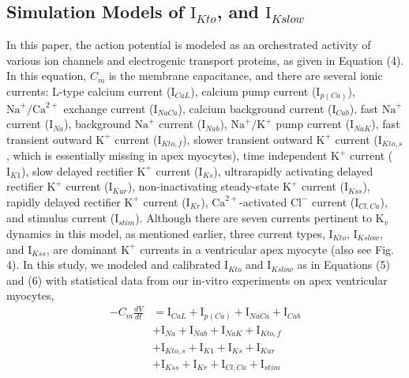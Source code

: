 \documentclass[journal]{IEEEtran}
\begin{document}
\subsection{Simulation Models of $\text{I}_{Kto}$, and $\text{I}_{Kslow}$}
In this paper, the action potential is modeled as an orchestrated activity of various ion channels and electrogenic transport proteins, as given in Equation (4). In this equation, $C_m$ is the membrane capacitance, and there are several ionic currents: L-type calcium current ($\text{I}_{CaL}$), calcium pump current ($\text{I}_{p(Ca)}$), $\text{Na}^{+}/\text{Ca}^{2+}$ exchange current ($\text{I}_{NaCa}$), calcium background current ($\text{I}_{Cab}$), fast $\text{Na}^{+}$ current ($\text{I}_{Na}$), background $\text{Na}^{+}$ current ($\text{I}_{Nab}$), $\text{Na}^{+}/\text{K}^{+}$ pump current ($\text{I}_{NaK}$), fast transient outward $\text{K}^{+}$ current ($\text{I}_{Kto,f}$), slower transient outward $\text{K}^{+}$ current ($\text{I}_{Kto,s}$, which is essentially missing in apex myocytes), time independent $\text{K}^{+}$ current ($\text{I}_{K1}$), slow delayed rectifier $\text{K}^{+}$ current ($\text{I}_{Ks}$), ultrarapidly activating delayed rectifier $\text{K}^{+}$ current ($\text{I}_{Kur}$), non-inactivating steady-state $\text{K}^{+}$ current ($\text{I}_{Kss}$), rapidly delayed rectifier $\text{K}^{+}$ current ($\text{I}_{Kr}$), $\text{Ca}^{2+}$-activated $\text{Cl}^{-}$ current ($\text{I}_{Cl,Ca}$), and stimulus current ($\text{I}_{stim}$). Although there are seven currents pertinent to $\text{K}_{v}$ dynamics in this model, as mentioned earlier, three current types, $\text{I}_{Kto}$, $\text{I}_{Kslow}$, and $\text{I}_{Kss}$, are dominant $\text{K}^{+}$ currents in a ventricular apex myocyte \cite{nerbonne2005molecular} (also see Fig. 4). In this study, we modeled and calibrated $\text{I}_{Kto}$ and $\text{I}_{Kslow}$ as in Equations (5) and (6) with statistical data from our in-vitro experiments on apex ventricular myocytes,
\begin{equation}
\begin{split}
    -C_{m}\frac{dV}{dt} &= \text{I}_{CaL}+\text{I}_{p(Ca)}+\text{I}_{NaCa}+\text{I}_{Cab}\\
    &+\text{I}_{Na}+\text{I}_{Nab}+\text{I}_{NaK}+\text{I}_{Kto,f}\\
    &+\text{I}_{Kto,s}+\text{I}_{K1}+\text{I}_{Ks}+\text{I}_{Kur}\\
    &+\text{I}_{Kss}+\text{I}_{Kr}+\text{I}_{Cl,Ca}+\text{I}_{stim}
\end{split}
\end{equation}
\end{document}
